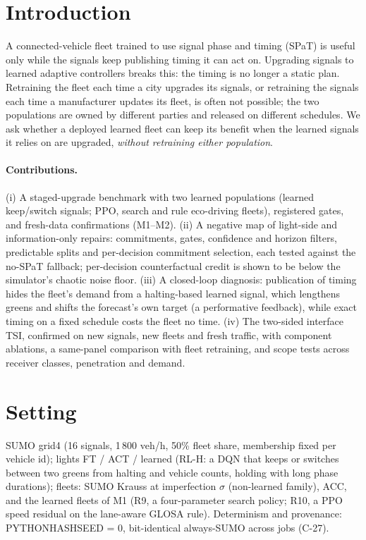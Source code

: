 \documentclass[11pt]{article}
\begin{document}
\section{Introduction}
A connected-vehicle fleet trained to use signal phase and timing (SPaT) is useful only while the signals keep publishing timing it can act
on. Upgrading signals to learned adaptive controllers breaks this: the timing is no longer a static plan. Retraining the fleet each time a
city upgrades its signals, or retraining the signals each time a manufacturer updates its fleet, is often not possible; the two populations
are owned by different parties and released on different schedules. We ask whether a deployed learned fleet can keep its benefit when the
learned signals it relies on are upgraded, \emph{without retraining either population}.
\paragraph{Contributions.}
(i) A staged-upgrade benchmark with two learned populations (learned keep/switch signals; PPO, search and rule eco-driving fleets),
registered gates, and fresh-data confirmations (M1--M2).
(ii) A negative map of light-side and information-only repairs: commitments, gates, confidence and horizon filters, predictable splits and
per-decision commitment selection, each tested against the no-SPaT fallback; per-decision counterfactual credit is shown to be below the
simulator's chaotic noise floor.
(iii) A closed-loop diagnosis: publication of timing hides the fleet's demand from a halting-based learned signal, which lengthens greens and
shifts the forecast's own target (a performative feedback), while exact timing on a fixed schedule costs the fleet no time.
(iv) The two-sided interface TSI, confirmed on new signals, new fleets and fresh traffic, with component ablations, a same-panel comparison
with fleet retraining, and scope tests across receiver classes, penetration and demand.

\section{Setting}
SUMO grid4 (16 signals, 1\,800 veh/h, 50\% fleet share, membership fixed per vehicle id); lights FT / ACT / learned (RL-H: a DQN that
keeps or switches between two greens from halting and vehicle counts, holding with long phase durations); fleets: SUMO Krauss at
imperfection $\sigma$ (non-learned family), ACC, and the learned fleets of M1 (R9, a four-parameter search policy; R10, a PPO speed
residual on the lane-aware GLOSA rule). Determinism and provenance: PYTHONHASHSEED = 0, bit-identical always-SUMO across jobs (C-27).
\end{document}

